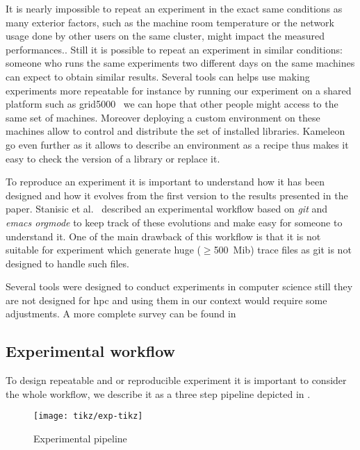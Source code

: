 It is nearly impossible to repeat an experiment in the exact same conditions
as many exterior factors, such as the machine room temperature or the network
usage done by other users on the same cluster, might impact the measured
performances..
Still it is possible to repeat an experiment in similar conditions: someone
who runs the same experiments two different days on the same machines can
expect to obtain similar results. Several tools can helps use making
experiments more repeatable for instance by running our experiment on a shared
platform such as grid5000~\cite{Cappello05Grid5000} we can hope that other
people might access to the same set of machines. Moreover deploying a custom
environment on these machines allow to control and distribute the set of
installed libraries. Kameleon~\cite{Ruiz15Reconstructable} go even
further as it allows to describe an environment as a recipe thus makes it easy
to check the version of a library or replace it.

To reproduce an experiment it is important to understand how it has been
designed and how it evolves from the first version to the results presented in
the paper. Stanisic et al.~\cite[Chapter~4, p31-44]{Stanisic15Reproducible}
described an experimental workflow based on \emph{git} and \emph{emacs orgmode}
to keep track of these evolutions and make easy for someone to understand it.
One of the main drawback of this workflow is that it is not suitable for
experiment which generate huge ($\ge$\SI{500}{Mib}) trace files as git is not
designed to handle such files.

Several tools were designed to conduct experiments in computer science still
they are not designed for \gls{hpc} and using them in our context would
require some adjustments. A more complete survey can be found
in~\cite[Chapter~3, p17-19]{Stanisic15Reproducible}

\subsection{Experimental workflow}

To design repeatable and or reproducible experiment it is important to
consider the whole workflow, we describe it as a three step pipeline depicted
in .

\begin{figure}[htb]
    \centering
    \texttt{[image: tikz/exp-tikz]}
    \caption{Experimental pipeline}
    \label{fig:exp-pipeline}
\end{figure}

